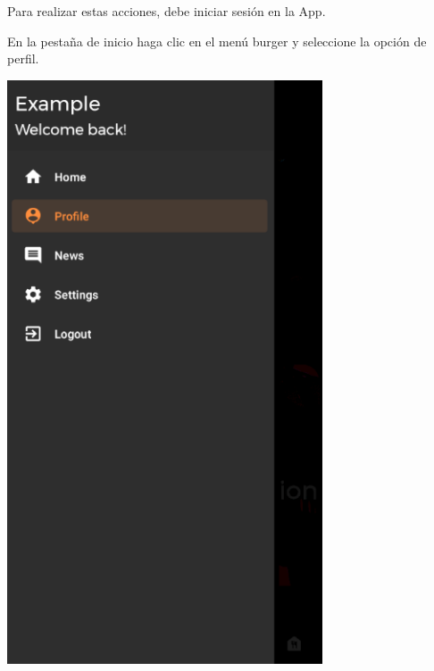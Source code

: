 \documentclass[12pt,a4paper]{article}
\begin{document}
\begin{enumerate}
\item Para realizar estas acciones, debe iniciar sesión en la App.

\begin{minipage}{.60\textwidth}
  \item En la pestaña de inicio haga clic en el menú burger y seleccione la opción de perfil.
\end{minipage}
\begin{minipage}{.40\textwidth}
  \includegraphics[width=0.7\textwidth, right]{selecionaprofile}
\end{minipage}


\end{enumerate}
\end{document}
